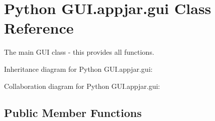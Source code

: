 \hypertarget{class_python_01_g_u_i_1_1appjar_1_1gui}{}\section{Python G\+U\+I.\+appjar.\+gui Class Reference}
\label{class_python_01_g_u_i_1_1appjar_1_1gui}


The main G\+UI class -\/ this provides all functions.  




Inheritance diagram for Python G\+U\+I.\+appjar.\+gui\+:


Collaboration diagram for Python G\+U\+I.\+appjar.\+gui\+:
\subsection*{Public Member Functions}
